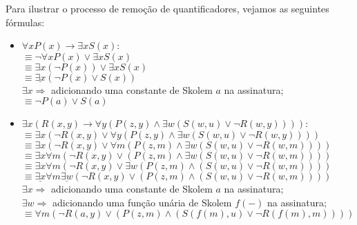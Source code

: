 Para ilustrar o processo de remoção de quantificadores, vejamos as seguintes fórmulas:
\begin{itemize}
    \item $\forall xP(x) \rightarrow \exists x S(x)$: \\
    $\equiv \neg \forall xP(x) \lor \exists x S(x)$ \\
    $\equiv \exists x (\neg P(x)) \lor \exists xS(x)$ \\
    $\equiv \underline{\exists x}(\neg P(x) \lor S(x))$  \\
    $\exists x \Rightarrow$ adicionando uma constante de Skolem $a$ na assinatura; \\
    $\equiv \neg P(a) \lor S(a)$ 
    \item $\exists x(R(x,y) \rightarrow \forall y(P(z,y) \land \exists w(S(w,u) \lor \neg R(w,y))))$: \\
    $\equiv \exists x(\neg R(x,y) \lor \forall y(P(z,y) \land \exists w(S(w,u) \lor \neg R(w,y))))$ \\
    $\equiv \exists x(\neg R(x,y) \lor \forall m(P(z,m) \land \exists w(S(w,u) \lor \neg R(w,m))))$ \\
    $\equiv \exists x\forall m(\neg R(x,y) \lor (P(z,m) \land \exists w(S(w,u) \lor \neg R(w,m))))$ \\
    $\equiv \exists x\forall m(\neg R(x,y) \lor \exists w(P(z,m) \land (S(w,u) \lor \neg R(w,m))))$ \\
    $\equiv \underline{\exists x}\forall m\underline{\exists w}(\neg R(x,y) \lor (P(z,m) \land (S(w,u) \lor \neg R(w,m))))$  \\
    $\exists x \Rightarrow$ adicionando uma constante de Skolem $a$ na assinatura; \\
    $\exists w \Rightarrow$ adicionando uma função unária de Skolem $f(-)$ na assinatura; \\
    $\equiv \forall m(\neg R(a,y) \lor (P(z,m) \land (S(f(m),u) \lor \neg R(f(m),m))))$ 
\end{itemize}